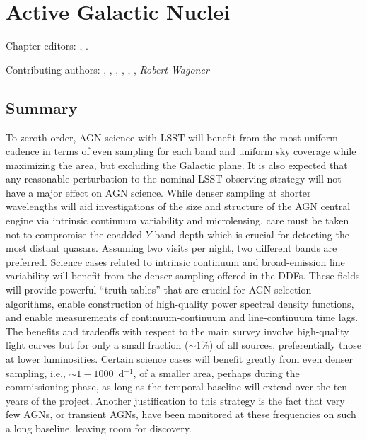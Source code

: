 
\chapter[AGN]{Active Galactic Nuclei}
\def\chpname{agn}\label{chp:\chpname}

Chapter editors:
,
.

Contributing authors:
,
,
,
,
,
,
{\it Robert Wagoner}

\section*{Summary}


To zeroth order, AGN science with LSST will benefit from the most uniform
cadence in terms of even sampling for each band and uniform sky coverage while
maximizing the area, but excluding the Galactic plane. It is also expected that
any reasonable perturbation to the nominal LSST observing strategy will not have
a major effect on AGN science. While denser sampling at shorter wavelengths will
aid investigations of the size and structure of the AGN central engine via
intrinsic continuum variability and microlensing, care must be taken not to
compromise the coadded $Y$-band depth which is crucial for detecting the most
distant quasars. Assuming two visits per night, two different bands are
preferred. Science cases related to intrinsic continuum and broad-emission line
variability will benefit from the denser sampling offered in the DDFs. These
fields will provide powerful ``truth tables'' that are crucial for AGN selection
algorithms, enable construction of high-quality power spectral density
functions, and enable measurements of continuum-continuum and line-continuum
time lags. The benefits and tradeoffs with respect to the main survey involve
high-quality light curves but for only a small fraction ($\sim1$\%) of all
sources, preferentially those at lower luminosities. Certain science cases will
benefit greatly from even denser sampling, i.e., $\sim1 - 1000$~d$^{-1}$, of a
smaller area, perhaps during the commissioning phase, as long as the temporal
baseline will extend over the ten years of the project. Another justification to
this strategy is the fact that very few AGNs, or transient AGNs, have been
monitored at these frequencies on such a long baseline, leaving room for
discovery.

